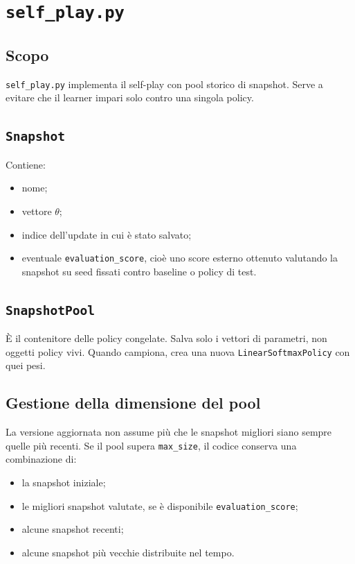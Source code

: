 \documentclass[11pt,a4paper]{article}
\begin{document}
\section{\texttt{self\_play.py}}

\subsection{Scopo}

\texttt{self\_play.py} implementa il self-play con pool storico di snapshot.
Serve a evitare che il learner impari solo contro una singola policy.

\subsection{\texttt{Snapshot}}

Contiene:

\begin{itemize}
  \item nome;
  \item vettore \(\theta\);
  \item indice dell'update in cui è stato salvato;
  \item eventuale \texttt{evaluation\_score}, cioè uno score esterno ottenuto
  valutando la snapshot su seed fissati contro baseline o policy di test.
\end{itemize}

\subsection{\texttt{SnapshotPool}}

È il contenitore delle policy congelate. Salva solo i vettori di parametri, non
oggetti policy vivi. Quando campiona, crea una nuova \texttt{LinearSoftmaxPolicy}
con quei pesi.

\subsection{Gestione della dimensione del pool}

La versione aggiornata non assume più che le snapshot migliori siano sempre
quelle più recenti. Se il pool supera \texttt{max\_size}, il codice conserva una
combinazione di:

\begin{itemize}
  \item la snapshot iniziale;
  \item le migliori snapshot valutate, se è disponibile
  \texttt{evaluation\_score};
  \item alcune snapshot recenti;
  \item alcune snapshot più vecchie distribuite nel tempo.
\end{itemize}
\end{document}
